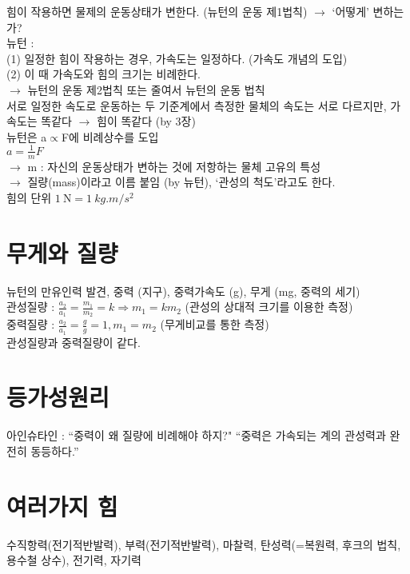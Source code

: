 \documentclass[10pt,a4paper]{report}
\begin{document}
	힘이 작용하면 물제의 운동상태가 변한다. (뉴턴의 운동 제1법칙) $\rightarrow$ `어떻게' 변하는가?\\
	뉴턴 :\\
	(1) 일정한 힘이 작용하는 경우, 가속도는 일정하다. (가속도 개념의 도입)\\
	(2) 이 때 가속도와 힘의 크기는 비례한다.\\
	$\rightarrow$ 뉴턴의 운동 제2법칙 또는 줄여서 뉴턴의 운동 법칙\\
	서로 일정한 속도로 운동하는 두 기준계에서 측정한 물체의 속도는 서로 다르지만, 가속도는 똑같다 $\rightarrow$ 힘이 똑같다 (by 3장)\\
	뉴턴은 a$\propto$F에 비례상수를 도입\\
	$a=\frac{1}{m}F$\\
	$\rightarrow$ m : 자신의 운동상태가 변하는 것에 저항하는 물체 고유의 특성\\
	$\rightarrow$ 질량(mass)이라고 이름 붙임 (by 뉴턴), `관성의 척도'라고도 한다.\\
	힘의 단위 $\SI{1}{\newton} = \SI{1}{kg.m/s^{2}}$\\ %
	
	\section{무게와 질량}
	
	뉴턴의 만유인력 발견, 중력 (지구), 중력가속도 (g), 무게 (mg, 중력의 세기)\\
	관성질량 : $\frac{a_2}{a_1} = \frac{m_1}{m_2} = k \Rightarrow m_1 = k m_2$ (관성의 상대적 크기를 이용한 측정)\\
	중력질량 : $\frac{a_2}{a_1} = \frac{g}{g} = 1, m_1 = m_2$ (무게비교를 통한 측정)\\
	관성질량과 중력질량이 같다.
	
	\section{등가성원리}
	
	아인슈타인 : ``중력이 왜 질량에 비례해야 하지?" ``중력은 가속되는 계의 관성력과 완전히 동등하다.''
	
	\section{여러가지 힘}
	
	수직항력(전기적반발력), 부력(전기적반발력), 마찰력, 탄성력(=복원력, 후크의 법칙, 용수철 상수), 전기력, 자기력
	
\end{document}
